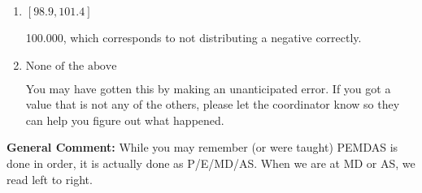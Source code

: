 \documentclass{extbook}[14pt]
\begin{document}
\begin{enumerate}
{\begin{enumerate}[label=\Alph*.]
 43.979, which corresponds to not distributing addition and subtraction correctly.
\item \( [98.9, 101.4] \)

 100.000, which corresponds to not distributing a negative correctly.
\item \( \text{None of the above} \)

 You may have gotten this by making an unanticipated error. If you got a value that is not any of the others, please let the coordinator know so they can help you figure out what happened.
\end{enumerate}

\textbf{General Comment:} While you may remember (or were taught) PEMDAS is done in order, it is actually done as P/E/MD/AS. When we are at MD or AS, we read left to right.
}
\end{enumerate}
\end{document}
